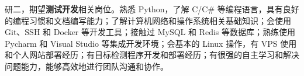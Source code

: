 {\onehalfspacing\hspace{2em}%
    研二，期望\textbf{测试开发}相关岗位。熟悉 Python，了解 C/C\# 等编程语言，具有良好的编程习惯和文档编写能力；了解计算机网络和操作系统相关基础知识；会使用 Git、SSH 和 Docker 等开发工具；接触过 MySQL 和 Redis 等数据库；熟练使用 Pycharm 和 Visual Studio 等集成开发环境；会基本的 Linux 操作，有 VPS 使用和个人网站部署经历；有目标检测程序开发和部署经历；有很强的自主学习和解决问题能力，能够高效地进行团队沟通和协作。
    \par}